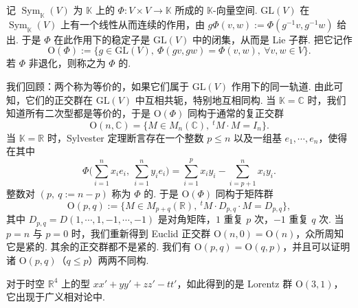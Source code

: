 \begin{numpara}[正交群]\label{np:ssl-1-2-9}
记 $\operatorname{Sym}_{\mathbb{K}}(V)$ 为 $\mathbb{K}$ 上的 $\Phi\colon V\times V\longrightarrow\mathbb{K}$ 所成的 $\mathbb{K}$-向量空间. $\mathrm{GL}(V)$ 在 $\operatorname{Sym}_{\mathbb{K}}(V)$ 上有一个线性从而连续的作用，由 $g\Phi(v,w):=\Phi(g^{-1}v,g^{-1}w)$ 给出. 于是 $\Phi$ 在此作用下的稳定子是 $\mathrm{GL}(V)$ 中的闭集，从而是 Lie 子群. 把它记作
\[
\mathrm{O}(\Phi):=\{g\in\mathrm{GL}(V),\ \Phi(gv,gw)=\Phi(v,w),\ \forall v,w\in V\}.
\]
若 $\Phi$ 非退化，则称之为 $\Phi$ 的.

我们回顾：两个称为等价的，如果它们属于 $\mathrm{GL}(V)$ 作用下的同一轨道. 由此可知，它们的正交群在 $\mathrm{GL}(V)$ 中互相共轭，特别地互相同构. 当 $\mathbb{K}=\mathbb{C}$ 时，我们知道所有二次型都是等价的，于是 $\mathrm{O}(\Phi)$ 同构于通常的复正交群
\[
\mathrm{O}(n,\mathbb{C})=\{M\in M_n(\mathbb{C}),\ {}^{t}M\cdot M=I_n\}.
\]
当 $\mathbb{K}=\mathbb{R}$ 时，Sylvester 定理断言存在一个整数 $p\leqslant n$ 以及一组基 $e_1,\cdots,e_n$，使得在其中
\[
\Phi\Big(\sum_{i=1}^{n}x_i e_i,\ \sum_{i=1}^{n}y_i e_i\Big)=\sum_{i=1}^{p}x_i y_i-\sum_{i=p+1}^{n}x_i y_i.
\]
整数对 $(p,\ q:=n-p)$ 称为 $\Phi$ 的. 于是 $\mathrm{O}(\Phi)$ 同构于矩阵群
\[
\mathrm{O}(p,q):=\{M\in M_{p+q}(\mathbb{R}),\ {}^{t}M\cdot D_{p,q}\cdot M=D_{p,q}\},
\]
其中 $D_{p,q}=D(1,\cdots,1,-1,\cdots,-1)$ 是对角矩阵，$1$ 重复 $p$ 次，$-1$ 重复 $q$ 次. 当 $p=n$ 与 $p=0$ 时，我们重新得到 Euclid 正交群 $\mathrm{O}(n,0)=\mathrm{O}(n)$，众所周知它是紧的. 其余的正交群都不是紧的. 我们有 $\mathrm{O}(p,q)=\mathrm{O}(q,p)$，并且可以证明诸 $\mathrm{O}(p,q)$（$q\leqslant p$）两两不同构.
\end{numpara}

\begin{example*}
对于时空 $\mathbb{R}^{4}$ 上的型 $xx'+yy'+zz'-tt'$，如此得到的是 Lorentz 群 $\mathrm{O}(3,1)$，它出现于广义相对论中.
\end{example*}


